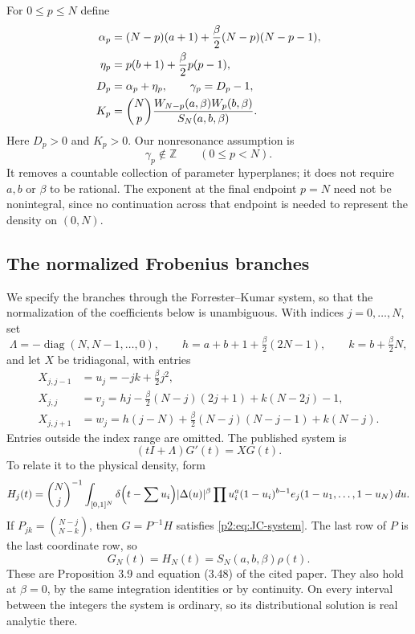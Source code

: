 \documentclass[11pt,a4paper]{article}
\theoremstyle{definition}
\theoremstyle{remark}
\numberwithin{equation}{section}
\begin{document}
For $0\le p\le N$ define
\begin{align}
 \alpha_p&=(N-p)(a+1)+\frac\beta2(N-p)(N-p-1),\notag\\
 \eta_p&=p(b+1)+\frac\beta2p(p-1),\notag\\
 D_p&=\alpha_p+\eta_p,\qquad \gamma_p=D_p-1,\label{p2:eq:JC-exponents}\\
 K_p&=\binom Np\frac{W_{N-p}(a,\beta)W_p(b,\beta)}{S_N(a,b,\beta)}.
 \label{p2:eq:JC-K}
\end{align}
Here $D_p>0$ and $K_p>0$.  Our nonresonance assumption is
\begin{equation}\label{p2:eq:JC-nonresonance}
 \gamma_p\notin\mathbb Z\qquad(0\le p<N).
\end{equation}
It removes a countable collection of parameter hyperplanes; it does not
require $a,b$ or $\beta$ to be rational.  The exponent at the final
endpoint $p=N$ need not be nonintegral, since no continuation across
that endpoint is needed to represent the density on $(0,N)$.

\subsection{The normalized Frobenius branches}

We specify the branches through the Forrester--Kumar system, so that the
normalization of the coefficients below is unambiguous.  With indices
$j=0,\ldots,N$, set
\[
 \Lambda=-\operatorname{diag}(N,N-1,\ldots,0),\qquad
 h=a+b+1+\tfrac\beta2(2N-1),\qquad k=b+\tfrac\beta2N,
\]
and let $X$ be tridiagonal, with entries
\begin{align*}
 X_{j,j-1}&=u_j=-jk+\tfrac\beta2j^2,\\
 X_{j,j}&=v_j=hj-\tfrac\beta2(N-j)(2j+1)+k(N-2j)-1,\\
 X_{j,j+1}&=w_j=h(j-N)+\tfrac\beta2(N-j)(N-j-1)+k(N-j).
\end{align*}
Entries outside the index range are omitted.  The published system is
\begin{equation}\label{p2:eq:JC-system}
 (tI+\Lambda)G'(t)=XG(t).
\end{equation}
To relate it to the physical density, form
\[
 H_j(t)=\binom Nj^{-1}\int_{[0,1]^N}
 \delta\Bigl(t-\sum u_i\Bigr)|\Delta(u)|^\beta
 \prod u_i^a(1-u_i)^{b-1}e_j(1-u_1,\ldots,1-u_N)\,du.
\]
If $P_{jk}=\binom{N-j}{N-k}$, then $G=P^{-1}H$ satisfies
\eqref{p2:eq:JC-system}.  The last row of $P$ is the last coordinate row,
so
\begin{equation}\label{p2:eq:JC-physical-component}
 G_N(t)=H_N(t)=S_N(a,b,\beta)\rho(t).
\end{equation}
These are Proposition 3.9 and equation (3.48) of the cited paper.
They also hold at $\beta=0$, by the same integration identities or
by continuity.  On every interval between the integers the system is
ordinary, so its distributional solution is real analytic there.
\end{document}
